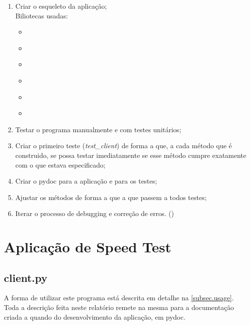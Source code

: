 \documentclass{report}
\begin{document}
\begin{enumerate}
	\item Criar o esqueleto da aplicação;\\
	Biliotecas usadas:
	\begin{itemize}
	\item \cite[\textit{Documentação sobre a classe socket em C}]{socketsc}
	\item \cite[\textit{Documentação sobre a classe csv em Python 3}]{csvpython}
	\item \cite[\textit{Documentação sobre a classe socket em Python 3}]{socketspython}
	\item \cite[\textit{Documentação sobre a classe pycripto em Python3}]{pycripto}
	\item \cite[\textit{Documentação sobre a classe JSON em Python 3}]{jsonpython}
	\item \cite[\textit{Documentação sobre a classe time em Python 3}]{timepython}
	\end{itemize}
	\item Testar o programa manualmente e com testes unitários;
	\item Criar o primeiro teste (\textit{test\_client}) de forma a que, a cada método que é construido, se possa testar imediatamente se esse método cumpre exatamente com o que estava especificado;
	\item Criar o pydoc para a aplicação e para os testes;
	\item Ajustar os métodos de forma a que a que passem a todos testes;
	\item Iterar o processo de debugging e correção de erros. (\cite[\textit{Stack Overflow}]{stackoverflow})
\end{enumerate}


\chapter{Aplicação de Speed Test}
\label{chap.Aplicação de Speed Test}
\section{client.py}
\label{sec.client}
A forma de utilizar este programa está descrita em detalhe na \autoref{subsec.usage}. Toda a descrição feita neste relatório remete na mesma para a documentação criada a quando do desenvolvimento da aplicação, em pydoc.
\end{document}
